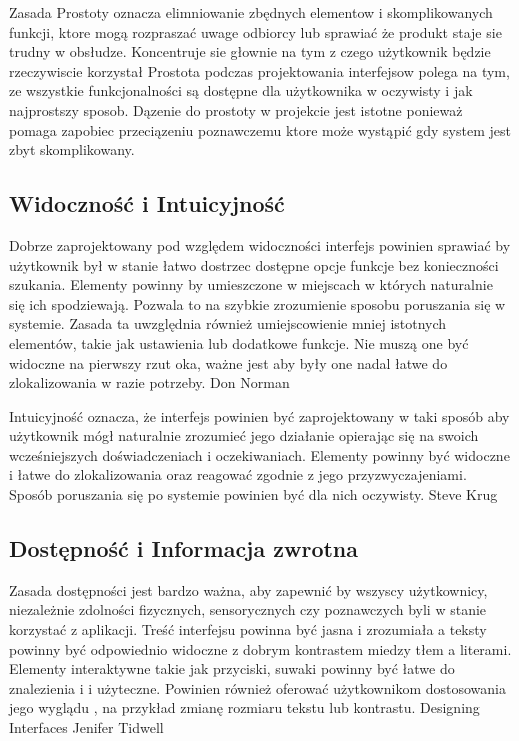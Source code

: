 Zasada Prostoty oznacza elimniowanie zbędnych elementow i skomplikowanych funkcji, ktore mogą rozpraszać uwage odbiorcy lub sprawiać że produkt staje sie trudny w obsłudze. Koncentruje sie głownie na tym z czego użytkownik będzie rzeczywiscie korzystał Prostota podczas projektowania interfejsow polega na tym, ze wszystkie funkcjonalności są dostępne dla użytkownika w oczywisty i jak najprostszy sposob. Dązenie do prostoty w projekcie jest istotne ponieważ pomaga zapobiec przeciązeniu poznawczemu ktore może wystąpić gdy system jest zbyt skomplikowany. 


\subsection{Widoczność i Intuicyjność}

Dobrze zaprojektowany pod względem widoczności interfejs powinien sprawiać by użytkownik był w stanie łatwo dostrzec dostępne opcje funkcje bez konieczności szukania. Elementy powinny by umieszczone w miejscach w których naturalnie się ich spodziewają. Pozwala to na szybkie zrozumienie sposobu poruszania się w systemie. Zasada ta uwzględnia również umiejscowienie mniej istotnych elementów, takie jak ustawienia lub dodatkowe funkcje. Nie muszą one być widoczne na pierwszy rzut oka, ważne jest aby były one nadal łatwe do zlokalizowania w razie potrzeby. Don Norman

Intuicyjność oznacza, że interfejs powinien być zaprojektowany w taki sposób aby użytkownik mógł naturalnie zrozumieć jego działanie opierając się na swoich wcześniejszych doświadczeniach i oczekiwaniach. Elementy powinny być widoczne i łatwe do zlokalizowania oraz reagować zgodnie z jego przyzwyczajeniami. Sposób poruszania się po systemie powinien być dla nich oczywisty. Steve Krug

\subsection{Dostępność i Informacja zwrotna}
Zasada dostępności jest bardzo ważna, aby zapewnić by wszyscy użytkownicy, niezależnie zdolności fizycznych, sensorycznych czy poznawczych  byli w stanie korzystać z aplikacji. Treść interfejsu powinna być jasna i zrozumiała a teksty powinny być odpowiednio widoczne  z dobrym kontrastem miedzy tłem a literami. Elementy interaktywne takie jak przyciski, suwaki powinny być łatwe do znalezienia i i użyteczne. Powinien również  oferować użytkownikom dostosowania jego wyglądu , na przykład zmianę rozmiaru tekstu lub kontrastu. Designing Interfaces Jenifer Tidwell

